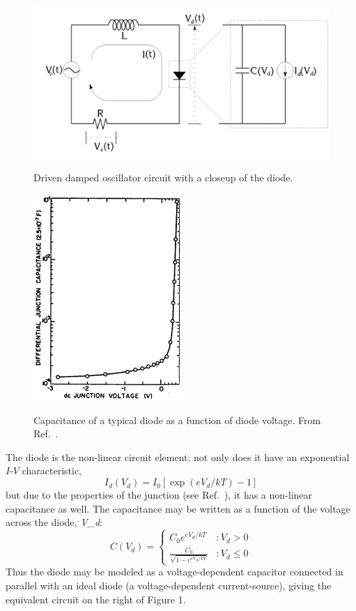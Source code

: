 \documentclass{../lab}
\begin{document}
\begin{figure}[h]
    \centering
    \href{http://experimentationlab.berkeley.edu/sites/default/files/images/Nldimage004.gif}{\includegraphics[width=0.5\linewidth]{images/Nldimage004.png}}
    \caption{Driven damped oscillator circuit with a closeup of the diode.}
    \label{fig:Circuit}
\end{figure}

\begin{figure}[h]
    \centering
    \href{http://experimentationlab.berkeley.edu/sites/default/files/images/Nldimage005.gif}{\includegraphics[width=0.4\linewidth]{images/Nldimage005.png}}
    \caption{Capacitance of a typical diode as a function of diode voltage. From Ref.~\cite{Hao}.}
    \label{fig:CapacitanceOfTypicalDiode}
\end{figure}

The diode is the non-linear circuit element: not only does it have an exponential $I$-$V$ characteristic,
\[
    I_d(V_d) = I_0[\exp(eV_d / kT) - 1]
\]
but due to the properties of the junction (see Ref.~\cite{Cvitanovic}), it has a non-linear capacitance as well. The capacitance may be written as a function of the voltage across the diode, \emph{V_{d}}:
\[
    C(V_d) =
    \begin{cases}
        C_0 e^{eV_d/kT} &: V_d > 0 \\
        \frac{C_0}{\sqrt {1-e^{eV_d/kT}}} &: V_d \le 0
    \end{cases}
\]
Thus the diode may be modeled as a voltage-dependent capacitor connected in parallel with an ideal diode (a voltage-dependent current-source), giving the equivalent circuit on the right of Figure 1.
\end{document}

